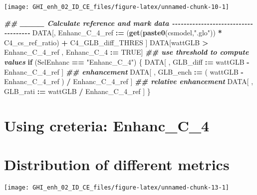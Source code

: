 \documentclass[
  10pt,
  a4paper,oneside]{article}
\newenvironment{Shaded}{\begin{snugshade}}{\end{snugshade}}
\newcommand{\ConstantTok}[1]{\textcolor[rgb]{0.56,0.35,0.01}{#1}}
\newcommand{\ControlFlowTok}[1]{\textcolor[rgb]{0.13,0.29,0.53}{\textbf{#1}}}
\newcommand{\DocumentationTok}[1]{\textcolor[rgb]{0.56,0.35,0.01}{\textbf{\textit{#1}}}}
\newcommand{\FunctionTok}[1]{\textcolor[rgb]{0.13,0.29,0.53}{\textbf{#1}}}
\newcommand{\NormalTok}[1]{#1}
\newcommand{\SpecialCharTok}[1]{\textcolor[rgb]{0.81,0.36,0.00}{\textbf{#1}}}
\newcommand{\StringTok}[1]{\textcolor[rgb]{0.31,0.60,0.02}{#1}}
\begin{document}
\begin{center}\texttt{[image: GHI\_enh\_02\_ID\_CE\_files/figure-latex/unnamed-chunk-10-1]} \end{center}

\begin{Shaded}
\begin{Highlighting}[]
\DocumentationTok{\#\# \_\_\_\_ Calculate reference and mark data  {-}{-}{-}{-}{-}{-}{-}{-}{-}{-}{-}{-}{-}{-}{-}{-}{-}{-}{-}{-}{-}{-}{-}{-}{-}{-}{-}{-}{-}{-}{-}{-}{-}{-}{-}{-}{-}}
\NormalTok{DATA[, Enhanc\_C\_4\_ref }\SpecialCharTok{:=}\NormalTok{ (}\FunctionTok{get}\NormalTok{(}\FunctionTok{paste0}\NormalTok{(csmodel,}\StringTok{".glo"}\NormalTok{)) }\SpecialCharTok{*}\NormalTok{ C4\_cs\_ref\_ratio) }\SpecialCharTok{+}\NormalTok{ C4\_GLB\_diff\_THRES ]}
\NormalTok{DATA[wattGLB }\SpecialCharTok{\textgreater{}}\NormalTok{ Enhanc\_C\_4\_ref ,}
\NormalTok{     Enhanc\_C\_4 }\SpecialCharTok{:=} \ConstantTok{TRUE}\NormalTok{]}
\DocumentationTok{\#\# use threshold to compute values}
\ControlFlowTok{if}\NormalTok{ (SelEnhanc }\SpecialCharTok{==} \StringTok{"Enhanc\_C\_4"}\NormalTok{) \{}
\NormalTok{    DATA[ , GLB\_diff }\SpecialCharTok{:=}\NormalTok{   wattGLB }\SpecialCharTok{{-}}\NormalTok{ Enhanc\_C\_4\_ref                    ] }\DocumentationTok{\#\# enhancement}
\NormalTok{    DATA[ , GLB\_ench }\SpecialCharTok{:=}\NormalTok{ ( wattGLB }\SpecialCharTok{{-}}\NormalTok{ Enhanc\_C\_4\_ref ) }\SpecialCharTok{/}\NormalTok{ Enhanc\_C\_4\_ref ] }\DocumentationTok{\#\# relative enhancement}
\NormalTok{    DATA[ , GLB\_rati }\SpecialCharTok{:=}\NormalTok{   wattGLB }\SpecialCharTok{/}\NormalTok{ Enhanc\_C\_4\_ref                    ]}
\NormalTok{\}}
\end{Highlighting}
\end{Shaded}

\FloatBarrier

\hypertarget{using-creteria-enhanc_c_4}{%
\section{Using creteria: Enhanc\_C\_4}\label{using-creteria-enhanc_c_4}}

\hypertarget{distribution-of-different-metrics}{%
\section{Distribution of different metrics}\label{distribution-of-different-metrics}}

\begin{center}\texttt{[image: GHI\_enh\_02\_ID\_CE\_files/figure-latex/unnamed-chunk-13-1]} \end{center}
\end{document}
